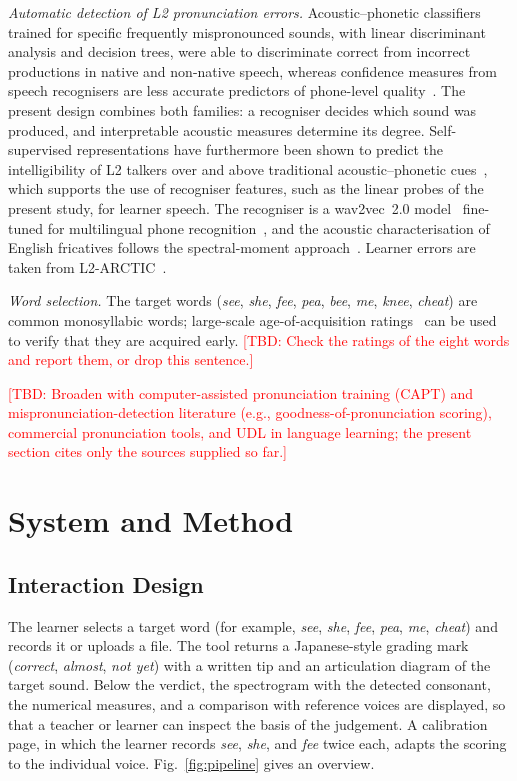 \documentclass[conference]{IEEEtran}
\newcommand{\tbd}[1]{\textcolor{red}{[TBD: #1]}}
\begin{document}
\textit{Automatic detection of L2 pronunciation errors.} Acoustic--phonetic classifiers trained for specific frequently mispronounced sounds, with linear discriminant analysis and decision trees, were able to discriminate correct from incorrect productions in native and non-native speech, whereas confidence measures from speech recognisers are less accurate predictors of phone-level quality~\cite{truong2005}. The present design combines both families: a recogniser decides which sound was produced, and interpretable acoustic measures determine its degree. Self-supervised representations have furthermore been shown to predict the intelligibility of L2 talkers over and above traditional acoustic--phonetic cues~\cite{kim2025}, which supports the use of recogniser features, such as the linear probes of the present study, for learner speech. The recogniser is a wav2vec~2.0 model~\cite{baevski2020} fine-tuned for multilingual phone recognition~\cite{xu2022}, and the acoustic characterisation of English fricatives follows the spectral-moment approach~\cite{jongman2000}. Learner errors are taken from L2-ARCTIC~\cite{zhao2018}.

\textit{Word selection.} The target words (\textit{see}, \textit{she}, \textit{fee}, \textit{pea}, \textit{bee}, \textit{me}, \textit{knee}, \textit{cheat}) are common monosyllabic words; large-scale age-of-acquisition ratings~\cite{kuperman2012} can be used to verify that they are acquired early. \tbd{Check the ratings of the eight words and report them, or drop this sentence.}

\textit{}

\tbd{Broaden with computer-assisted pronunciation training (CAPT) and mispronunciation-detection literature (e.g., goodness-of-pronunciation scoring), commercial pronunciation tools, and UDL in language learning; the present section cites only the sources supplied so far.}

\section{System and Method}
\subsection{Interaction Design}
The learner selects a target word (for example, \textit{see}, \textit{she}, \textit{fee}, \textit{pea}, \textit{me}, \textit{cheat}) and records it or uploads a file. The tool returns a Japanese-style grading mark (\textit{correct}, \textit{almost}, \textit{not yet}) with a written tip and an articulation diagram of the target sound. Below the verdict, the spectrogram with the detected consonant, the numerical measures, and a comparison with reference voices are displayed, so that a teacher or learner can inspect the basis of the judgement. A calibration page, in which the learner records \textit{see}, \textit{she}, and \textit{fee} twice each, adapts the scoring to the individual voice. Fig.~\ref{fig:pipeline} gives an overview.
\end{document}
